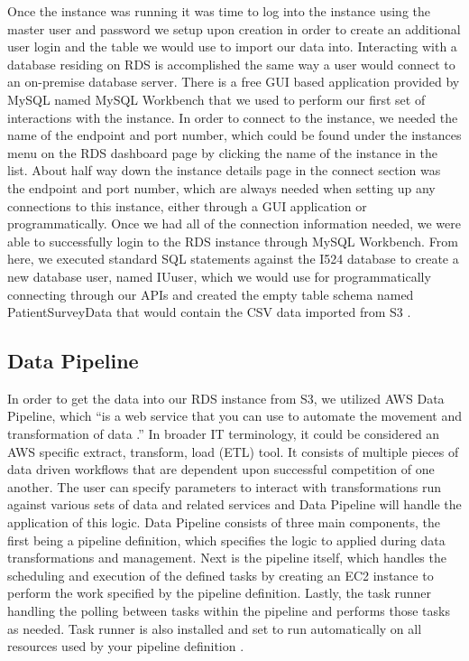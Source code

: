 Once the instance was running it was time to log into the instance using the 
master user and password we setup upon creation in order to create an 
additional user login and the table we would use to import our data into. 
Interacting with a database residing on RDS is accomplished the same way a 
user would connect to an on-premise database server. There is a free GUI based 
application provided by MySQL named MySQL Workbench that we used to perform 
our first set of interactions with the instance. In order to connect to the 
instance, we needed the name of the endpoint and port number, which could be 
found under the instances menu on the RDS dashboard page by clicking the name 
of the instance in the list. About half way down the instance details page in 
the connect section was the endpoint and port number, which are always needed 
when setting up any connections to this instance, either through a GUI 
application or programmatically. Once we had all of the connection information 
needed, we were able to successfully login to the RDS instance through MySQL 
Workbench. From here, we executed standard SQL statements against the I524 
database to create a new database user, named IUuser, which we would use for 
programmatically connecting through our APIs and created the empty table 
schema named PatientSurveyData that would contain the CSV data imported 
from S3 \cite{hid-sp18-521-rds-mysql}. 

\subsection{Data Pipeline}

In order to get the data into our RDS instance from S3, we utilized AWS Data 
Pipeline, which ``is a web service that you can use to automate the movement 
and transformation of data \cite{hid-sp18-521-whatisdatapipeline}.'' In 
broader IT terminology, it could be considered an AWS specific extract, 
transform, load (ETL) tool. It consists of multiple pieces of data driven 
workflows that are dependent upon successful competition of one another. 
The user can specify parameters to interact with transformations run against 
various sets of data and related services and Data Pipeline will handle the 
application of this logic. Data Pipeline consists of three main components, 
the first being a pipeline definition, which specifies the logic to applied 
during data transformations and management. Next is the pipeline itself, which 
handles the scheduling and execution of the defined tasks by creating an EC2 
instance to perform the work specified by the pipeline definition. Lastly, 
the task runner handling the polling between tasks within the pipeline and 
performs those tasks as needed. Task runner is also installed and set to run 
automatically on all resources used by your pipeline 
definition \cite{hid-sp18-521-whatisdatapipeline}. 

